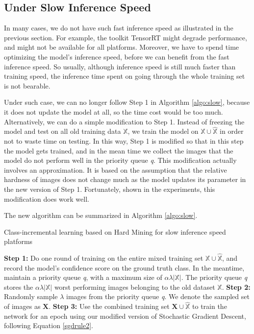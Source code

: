 \subsection{Under Slow Inference Speed}

In many cases, we do not have such fast inference speed as illustrated in the previous section. For example, the toolkit TensorRT might degrade performance, and might not be available for all platforms. Moreover, we have to spend time optimizing the model's inference speed, before we can benefit from the fast inference speed. So usually, although inference speed is still much faster than training speed, the inference time spent on going through the whole training set is not bearable.

Under such case, we can no longer follow Step 1 in Algorithm \ref{algo:slow}, because it does not update the model at all, so the time cost would be too much. Alternatively, we can do a simple modification to Step 1. Instead of freezing the model and test on all old training data $\mathbb{X}$, we train the model on $\mathbb{X}\cup \hat{\mathbb{X}}$ in order not to waste time on testing. In this way, Step 1 is modified so that in this step the model gets trained, and in the mean time we collect the images that the model do not perform well in the priority queue \textit{q}. This modification actually involves an approximation. It is based on the assumption that the relative hardness of images does not change much as the model updates its parameter in the new version of Step 1. Fortunately, shown in the experiments, this modification does work well.

The new algorithm can be summarized in Algorithm \ref{algo:slow}.

\begin{algorithm}
	\caption{Class-incremental learning based on Hard Mining for slow inference speed platforms}
	\label{algo:slow}
	\begin{algorithmic}
		\State \textbf{Step 1:} Do one round of training on the entire mixed training set $\mathbb{X}\cup \hat{\mathbb{X}}$, and record the model's confidence score on the ground truth class. In the meantime, maintain a priority queue \textit{q}, with a maximum size of $\alpha \lambda |\mathbb{X}|$. The priority queue \textit{q} stores the $\alpha \lambda |\mathbb{X}|$ worst performing images belonging to the old dataset $\mathbb{X}$.
		\State \textbf{Step 2:} Randomly sample $\lambda$ images from the priority queue \textit{q}. We denote the sampled set of images as $\mathbf{X}$. 
		\State \textbf{Step 3:} Use the combined training set $\mathbf{X} \cup \hat{\mathbb{X}}$ to train the network for an epoch using our modified version of Stochastic Gradient Descent, following Equation \ref{sgdrule2}.
		\EndFor
	\end{algorithmic}
\end{algorithm}









